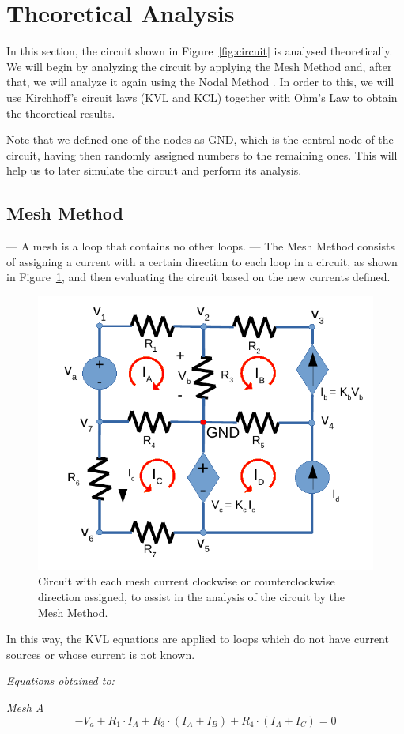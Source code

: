 \section{Theoretical Analysis}
\label{sec:analysis}

In this section, the circuit shown in Figure~\ref{fig:circuit} is analysed
theoretically. We will begin by analyzing the circuit by applying the Mesh Method and, after that, we will analyze it again using the Nodal Method . In order to this, we will use Kirchhoff's circuit laws (KVL and KCL) together with Ohm's Law to obtain the theoretical results.

Note that we defined one of the nodes as GND, which is the central node of the circuit, 
having then randomly assigned numbers to the remaining ones. This will help us to
later simulate the circuit and perform its analysis.

 
\subsection{Mesh Method}

--- A mesh is a loop that contains no other loops. ---
The Mesh Method consists of assigning a current with a certain direction to each loop in a circuit, as shown in Figure~\ref{fig:mcurrents}, and then evaluating the circuit based on the new currents defined.

\begin{figure}[h!] \centering
\includegraphics[width=0.4\linewidth]{mcurrents.pdf}
\caption{Circuit with each mesh current clockwise or counterclockwise direction assigned, to assist in the analysis of the circuit by the Mesh Method.}
\label{fig:mcurrents}
\end{figure}

In this way, the KVL equations are applied to loops which do not have current sources or whose current is not known.

\textit{Equations obtained to:}

\textit{Mesh A}
\begin{equation}
  -V_a+ R_1\cdot I_A + R_3 \cdot (I_A+I_B)+ R_4 \cdot (I_A+I_C) =0
  \label{eq:kvl}
\end{equation}

